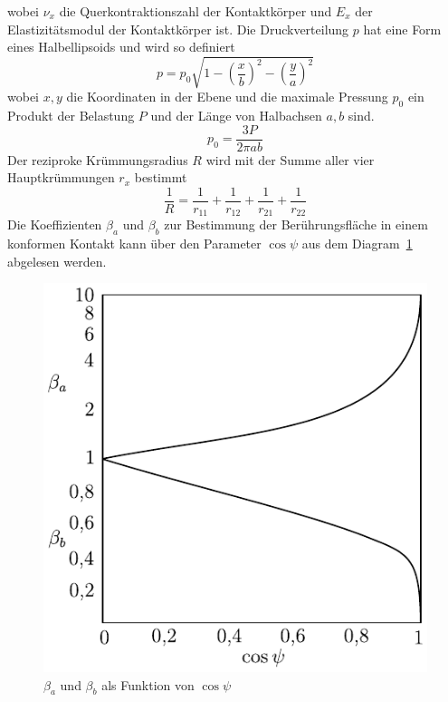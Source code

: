 %
wobei $\nu_x$ die Querkontraktionszahl der Kontaktkörper und $E_x$ der Elastizitätsmodul der Kontaktkörper ist.
Die Druckverteilung $p$ hat eine Form eines Halbellipsoids und wird so definiert
\begin{equation}
    \label{eq:druckverteilung}
    p = p_0  \sqrt{1 - \left( \frac{x}{b} \right)^2 - \left( \frac{y}{a} \right)^2}
\end{equation}
%
wobei $x, y$ die Koordinaten in der Ebene und die maximale Pressung $p_0$ ein Produkt der Belastung $P$ und der Länge von Halbachsen $a, b$ sind.
\begin{equation}
    \label{eq:maximale_pressung}
    p_0 = \frac{3  P}{2  \pi  a  b}
\end{equation}
%
Der reziproke Krümmungsradius $R$ wird mit der Summe aller vier Hauptkrümmungen $r_x$ bestimmt
\begin{equation}
    \label{eq:kruemmungsradius}
    \frac{1}{R} = \frac{1}{r_{11}} + \frac{1}{r_{12}} + \frac{1}{r_{21}} + \frac{1}{r_{22}}
\end{equation}
%
Die Koeffizienten $\beta_a$ und $\beta_b$ zur Bestimmung der Berührungsfläche in einem konformen Kontakt kann über den Parameter $\cos{\psi}$ aus dem Diagram~\ref{fig:beta_a_und_beta_b_als_funktion_der_cos_psi} abgelesen werden.
\begin{figure}[htb]
    \centering
    \includegraphics[]{./images/beta_cos_psi_diagram.pdf}
    \caption{$\beta_a$ und $\beta_b$ als Funktion von $\cos{\psi}$\cite{wisniewski}}
    \label{fig:beta_a_und_beta_b_als_funktion_der_cos_psi}
\end{figure}
%

